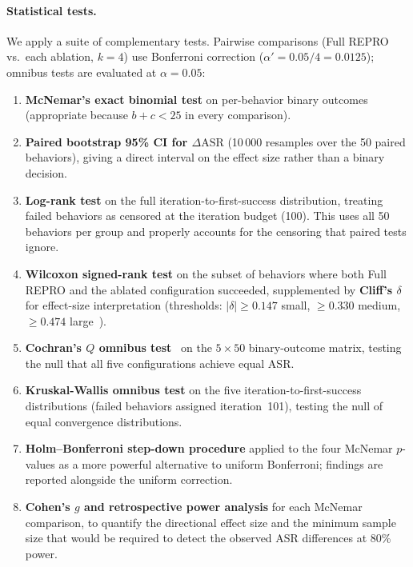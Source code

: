 \paragraph{Statistical tests.}
We apply a suite of complementary tests.  Pairwise comparisons (Full REPRO
vs.\ each ablation, $k{=}4$) use Bonferroni correction
($\alpha' = 0.05/4 = 0.0125$); omnibus tests are evaluated at $\alpha = 0.05$:
\begin{enumerate}[noitemsep]
  \item \textbf{McNemar's exact binomial test} on per-behavior binary
        outcomes (appropriate because $b{+}c < 25$ in every comparison).
  \item \textbf{Paired bootstrap 95\% CI for $\Delta\text{ASR}$}
        (10\,000 resamples over the 50 paired behaviors), giving a direct
        interval on the effect size rather than a binary decision.
  \item \textbf{Log-rank test} on the full iteration-to-first-success
        distribution, treating failed behaviors as censored at the
        iteration budget (100). This uses all 50 behaviors per group and
        properly accounts for the censoring that paired tests ignore.
  \item \textbf{Wilcoxon signed-rank test} on the subset of behaviors
        where both Full REPRO and the ablated configuration succeeded,
        supplemented by \textbf{Cliff's $\delta$} for effect-size
        interpretation (thresholds: $|\delta| \geq 0.147$ small,
        $\geq 0.330$ medium, $\geq 0.474$ large~\cite{romano2006}).
  \item \textbf{Cochran's $Q$ omnibus test}~\cite{cochran1950} on the
        $5{\times}50$ binary-outcome matrix, testing the null that all five
        configurations achieve equal ASR.
  \item \textbf{Kruskal-Wallis omnibus test} on the five
        iteration-to-first-success distributions (failed behaviors assigned
        iteration~101), testing the null of equal convergence distributions.
  \item \textbf{Holm–Bonferroni step-down procedure} applied to the four
        McNemar $p$-values as a more powerful alternative to uniform
        Bonferroni; findings are reported alongside the uniform correction.
  \item \textbf{Cohen's $g$ and retrospective power analysis} for each
        McNemar comparison, to quantify the directional effect size and the
        minimum sample size that would be required to detect the observed
        ASR differences at $80$\% power.
\end{enumerate}

